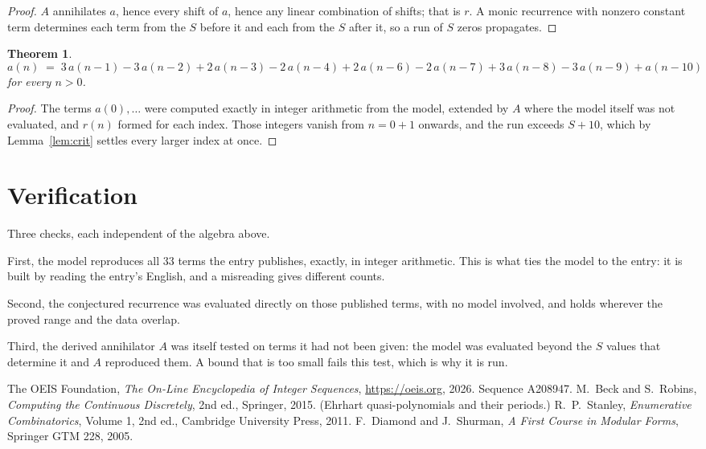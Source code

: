 \documentclass[11pt,a4paper]{article}
\theoremstyle{plain}
\newtheorem{theorem}{Theorem}
\theoremstyle{definition}
\begin{document}
\begin{proof}
$A$ annihilates $a$, hence every shift of $a$, hence any linear combination of shifts; that is
$r$. A monic recurrence with nonzero constant term determines each term from the $S$ before it
and each from the $S$ after it, so a run of $S$ zeros propagates.
\end{proof}

\begin{theorem}
\[
a(n)\;=\;3\,a(n-1) - 3\,a(n-2) + 2\,a(n-3) - 2\,a(n-4) + 2\,a(n-6) - 2\,a(n-7) + 3\,a(n-8) - 3\,a(n-9) + a(n-10)
\]
for every $n>0$.
\end{theorem}

\begin{proof}
The terms $a(0),\dots$ were computed exactly in integer arithmetic from the model, extended by
$A$ where the model itself was not evaluated, and $r(n)$ formed for each index. Those integers
vanish from $n=0+1$ onwards, and the run exceeds $S+10$, which by
Lemma~\ref{lem:crit} settles every larger index at once.
\end{proof}

\section{Verification}

Three checks, each independent of the algebra above.

First, the model reproduces all $33$ terms the entry publishes, exactly, in integer
arithmetic. This is what ties the model to the entry: it is built by reading the entry's
English, and a misreading gives different counts.

Second, the conjectured recurrence was evaluated directly on those published terms, with no
model involved, and holds wherever the proved range and the data overlap.

Third, the derived annihilator $A$ was itself tested on terms it had not been given: the model
was evaluated beyond the $S$ values that determine it and $A$ reproduced them. A bound that is
too small fails this test, which is why it is run.

\begin{thebibliography}{9}
 The OEIS Foundation, \emph{The On-Line Encyclopedia of Integer
Sequences}, \url{https://oeis.org}, 2026. Sequence A208947.
 M.~Beck and S.~Robins, \emph{Computing the Continuous Discretely},
2nd ed., Springer, 2015. (Ehrhart quasi-polynomials and their periods.)
 R.~P.~Stanley, \emph{Enumerative Combinatorics}, Volume 1, 2nd ed.,
Cambridge University Press, 2011.
 F.~Diamond and J.~Shurman, \emph{A First Course in Modular Forms},
Springer GTM 228, 2005.
\end{thebibliography}
\end{document}
